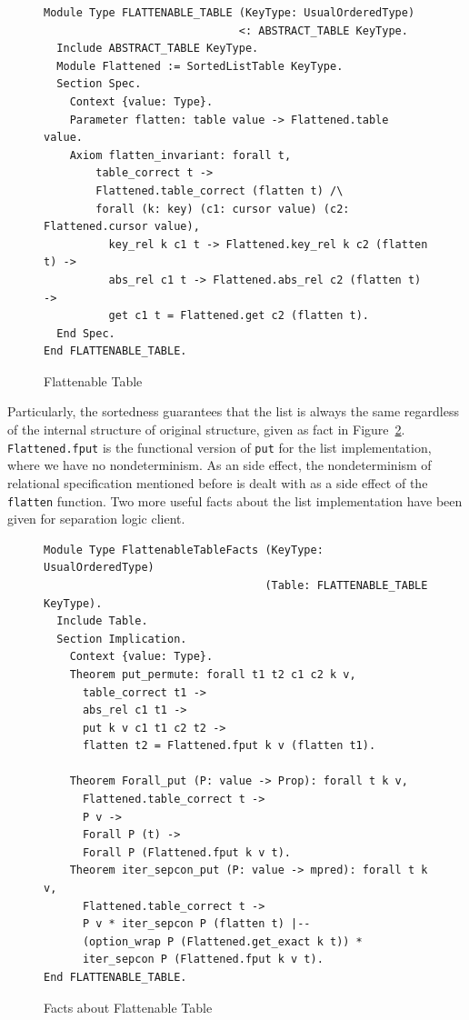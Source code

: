 \documentclass[runningheads]{llncs}
\begin{document}
\begin{figure}[htbp]
  \centering
\begin{verbatim}
Module Type FLATTENABLE_TABLE (KeyType: UsualOrderedType)
                              <: ABSTRACT_TABLE KeyType.
  Include ABSTRACT_TABLE KeyType.
  Module Flattened := SortedListTable KeyType.
  Section Spec.
    Context {value: Type}.
    Parameter flatten: table value -> Flattened.table value.
    Axiom flatten_invariant: forall t,
        table_correct t ->
        Flattened.table_correct (flatten t) /\
        forall (k: key) (c1: cursor value) (c2: Flattened.cursor value),
          key_rel k c1 t -> Flattened.key_rel k c2 (flatten t) ->
          abs_rel c1 t -> Flattened.abs_rel c2 (flatten t) ->
          get c1 t = Flattened.get c2 (flatten t).
  End Spec.
End FLATTENABLE_TABLE.
\end{verbatim}
  \caption{Flattenable Table}\label{fig:flatten}
\end{figure}

Particularly, the sortedness guarantees that the list is always the same
regardless of the internal structure of original structure, given as fact in
Figure~\ref{fig:flatten_fact}. \texttt{Flattened.fput} is the functional version
of \texttt{put} for the list implementation, where we have no nondeterminism. As
an side effect, the nondeterminism of relational specification mentioned before
is dealt with as a side effect of the \texttt{flatten} function. Two more useful
facts about the list implementation have been given for separation logic client.


\begin{figure}[htbp]
  \centering
\begin{verbatim}
Module Type FlattenableTableFacts (KeyType: UsualOrderedType)
                                  (Table: FLATTENABLE_TABLE KeyType).
  Include Table.
  Section Implication.
    Context {value: Type}.
    Theorem put_permute: forall t1 t2 c1 c2 k v,
      table_correct t1 ->
      abs_rel c1 t1 ->
      put k v c1 t1 c2 t2 ->
      flatten t2 = Flattened.fput k v (flatten t1).

    Theorem Forall_put (P: value -> Prop): forall t k v,
      Flattened.table_correct t ->
      P v ->
      Forall P (t) ->
      Forall P (Flattened.fput k v t).
    Theorem iter_sepcon_put (P: value -> mpred): forall t k v,
      Flattened.table_correct t ->
      P v * iter_sepcon P (flatten t) |--
      (option_wrap P (Flattened.get_exact k t)) *
      iter_sepcon P (Flattened.fput k v t).
End FLATTENABLE_TABLE.
\end{verbatim}
  \caption{Facts about Flattenable Table}\label{fig:flatten_fact}
\end{figure}
\end{document}
